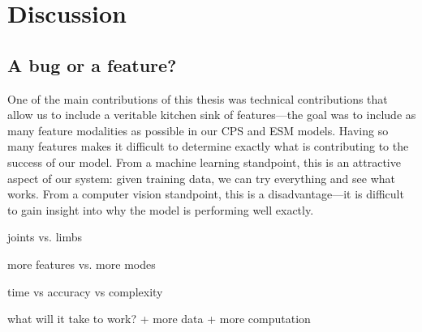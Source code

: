 \chapter{Discussion}\label{sec:discussion}



\section{A bug or a feature?}
One of the main contributions of this thesis was technical contributions that 
allow us to include a veritable kitchen sink of features---the goal was to 
include as many feature modalities as possible in our CPS and ESM models.  
Having so many features makes it difficult to determine exactly what is 
contributing to the success of our model.  From a machine learning standpoint, 
this is an attractive aspect of our system: given training data, we can try 
everything and see what works.  From a computer vision standpoint, this is a 
disadvantage---it is difficult to gain insight into why the model is performing 
well exactly.

joints vs. limbs

more features vs. more modes

time vs accuracy vs complexity

what will it take to work?
  + more data
  + more computation
